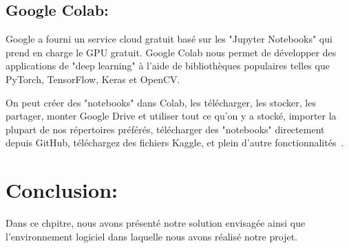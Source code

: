 \subsection{Google Colab:}
Google a fourni un service cloud gratuit basé sur les "Jupyter Notebooks" qui prend en charge le GPU gratuit. Google Colab nous permet de développer des applications de "deep learning" à l'aide de bibliothèques populaires telles que PyTorch, TensorFlow, Keras et OpenCV.

On peut créer des "notebooks" dans Colab, les télécharger, les stocker, les partager, monter Google Drive et utiliser tout ce qu'on y a stocké, importer la plupart de nos répertoires préférés, télécharger des "notebooks" directement depuis GitHub, téléchargez des fichiers Kaggle, et plein d'autre fonctionnalités~\cite{googlecolab}.

\section{Conclusion:}
Dans ce chpitre, nous avons présenté notre solution envisagée ainsi que l'environnement logiciel dans laquelle nous avons réalisé notre projet.




